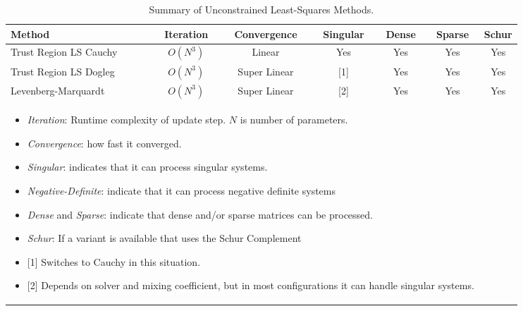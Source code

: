 \documentclass[peerreview,compsoc,onecolumn]{IEEEtran}
\begin{document}
\begin{table}[h]
\caption{\label{summary:UM}Summary of Unconstrained Least-Squares Methods.}
\centering
\begin{tabular}{lcccccc}
Method & Iteration & Convergence & Singular & Dense & Sparse & Schur \\[1ex]
\hline
Trust Region LS Cauchy & $O(N^3)$ & Linear       & Yes  & Yes  & Yes & Yes \rule{0pt}{2.6ex}  \\
Trust Region LS Dogleg & $O(N^3)$ & Super Linear & [1]  & Yes  & Yes & Yes \\
Levenberg-Marquardt    & $O(N^3)$ & Super Linear & [2]  & Yes  & Yes & Yes \\[1ex]
\multicolumn{6}{l}{
\begin{minipage}{0.6\textwidth}
\centering
\vspace{2mm}
\begin{itemize}[leftmargin=*]
\item \emph{Iteration}: Runtime complexity of update step. $N$ is number of parameters.
\item \emph{Convergence}: how fast it converged.
\item \emph{Singular}: indicates that it can process singular systems.
\item \emph{Negative-Definite}: indicate that it can process negative definite systems
\item \emph{Dense} and \emph{Sparse}: indicate that dense and/or sparse matrices can be processed. 
\item \emph{Schur}: If a variant is available that uses the Schur Complement
\item {[1]} Switches to Cauchy in this situation.
\item {[2]} Depends on solver and mixing coefficient, but in most configurations it can handle singular systems.
\end{itemize}
\end{minipage}
 }
\end{tabular}
\end{table}
\end{document}
